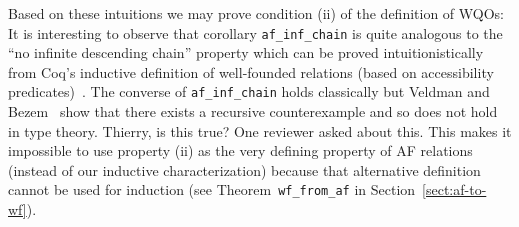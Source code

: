 \documentclass{llncs}
\newcommand{\dv}[1]{{\color{red}{\bf DV:} #1}}
\begin{document}


Based on these intuitions we may prove condition (ii) of the definition of
WQOs: 
It is interesting to observe that corollary \lstinline|af_inf_chain| is quite analogous to 
the ``no infinite descending chain'' property which can be proved intuitionistically 
from Coq's inductive definition of well-founded relations (based on accessibility predicates)~\cite{coqart}.
The converse of \lstinline|af_inf_chain| holds classically but Veldman and Bezem~\cite{Veldman01041993} show 
that there exists a recursive counterexample and so does not hold in type theory. \dv{Thierry, is this true? One reviewer asked about this.}
This makes it impossible to use property (ii) as the very defining property of 
AF relations (instead of our inductive characterization) because that alternative definition
cannot be used for induction (see Theorem~\lstinline|wf_from_af| in Section~\ref{sect:af-to-wf}).
\end{document}

